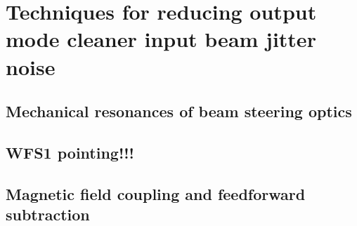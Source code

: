 \chapter{Techniques for reducing output mode cleaner input beam jitter noise}

\section{Mechanical resonances of beam steering optics}

\section{WFS1 pointing!!!}

\section{Magnetic field coupling and feedforward subtraction}